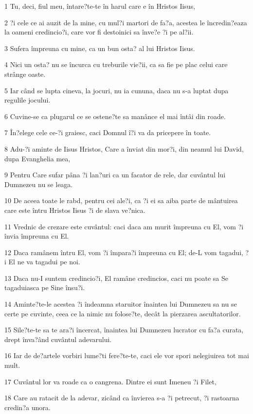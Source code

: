 \par 1 Tu, deci, fiul meu, întare?te-te în harul care e în Hristos Iisus,
\par 2 ?i cele ce ai auzit de la mine, cu mul?i martori de fa?a, acestea le încredin?eaza la oameni credincio?i, care vor fi destoinici sa înve?e ?i pe al?ii.
\par 3 Sufera împreuna cu mine, ca un bun osta? al lui Hristos Iisus.
\par 4 Nici un osta? nu se încurca cu treburile vie?ii, ca sa fie pe plac celui care strânge oaste.
\par 5 Iar când se lupta cineva, la jocuri, nu ia cununa, daca nu s-a luptat dupa regulile jocului.
\par 6 Cuvine-se ca plugarul ce se ostene?te sa manânce el mai întâi din roade.
\par 7 În?elege cele ce-?i graiesc, caci Domnul î?i va da pricepere în toate.
\par 8 Adu-?i aminte de Iisus Hristos, Care a înviat din mor?i, din neamul lui David, dupa Evanghelia mea,
\par 9 Pentru Care sufar pâna ?i lan?uri ca un facator de rele, dar cuvântul lui Dumnezeu nu se leaga.
\par 10 De aceea toate le rabd, pentru cei ale?i, ca ?i ei sa aiba parte de mântuirea care este întru Hristos Iisus ?i de slava ve?nica.
\par 11 Vrednic de crezare este cuvântul: caci daca am murit împreuna cu El, vom ?i învia împreuna cu El.
\par 12 Daca ramânem întru El, vom ?i împara?i împreuna cu El; de-L vom tagadui, ?i El ne va tagadui pe noi.
\par 13 Daca nu-I suntem credincio?i, El ramâne credincios, caci nu poate sa Se tagaduiasca pe Sine însu?i.
\par 14 Aminte?te-le acestea ?i îndeamna staruitor înaintea lui Dumnezeu sa nu se certe pe cuvinte, ceea ce la nimic nu folose?te, decât la pierzarea ascultatorilor.
\par 15 Sile?te-te sa te ara?i încercat, înaintea lui Dumnezeu lucrator cu fa?a curata, drept înva?ând cuvântul adevarului.
\par 16 Iar de de?artele vorbiri lume?ti fere?te-te, caci ele vor spori nelegiuirea tot mai mult.
\par 17 Cuvântul lor va roade ca o cangrena. Dintre ei sunt Imeneu ?i Filet,
\par 18 Care au ratacit de la adevar, zicând ca învierea s-a ?i petrecut, ?i rastoarna credin?a unora.
